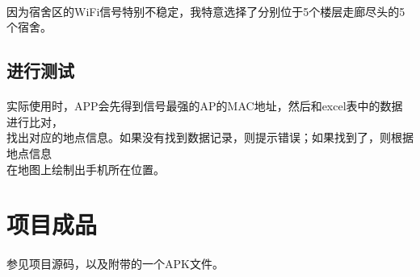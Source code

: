 \documentclass[a4paper,10pt]{article}
\begin{document}
    \paragraph{} 因为宿舍区的WiFi信号特别不稳定，我特意选择了分别位于5个楼层走廊尽头的5个宿舍。
    \subsection{进行测试}
    \paragraph{} 实际使用时，APP会先得到信号最强的AP的MAC地址，然后和excel表中的数据进行比对，\\
    找出对应的地点信息。如果没有找到数据记录，则提示错误；如果找到了，则根据地点信息\\
    在地图上绘制出手机所在位置。
    
  \section{项目成品}
    \paragraph{}参见项目源码，以及附带的一个APK文件。
    
\end{document}
